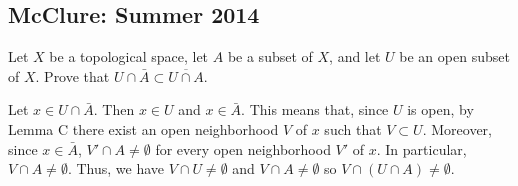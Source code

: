 \subsection{McClure: Summer 2014}
\setcounter{exercise}{0}
\begin{problem}
  Let \(X\) be a topological space, let \(A\) be a subset of \(X\), and let
  \(U\) be an open subset of \(X\). Prove that
  \(U\cap \bar A\subset\overline{U\cap A}\).
\end{problem}
\begin{solution}
  Let \(x\in U\cap\bar A\). Then \(x\in U\) and \(x\in\bar A\). This means
  that, since \(U\) is open, by Lemma C there exist an open neighborhood
  \(V\) of \(x\) such that \(V\subset U\). Moreover, since
  \(x\in\bar A\), \(V'\cap A\neq\emptyset\) for every open neighborhood
  \(V'\) of \(x\). In particular, \(V\cap A\neq\emptyset\). Thus, we have
  \(V\cap U\neq\emptyset\) and \(V\cap A\neq\emptyset\) so
  \(V\cap(U\cap A)\neq\emptyset\).
\end{solution}

